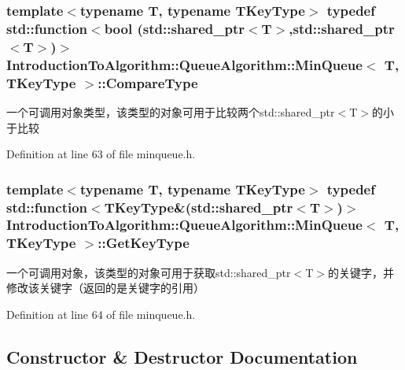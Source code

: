 \subsubsection[{Compare\+Type}]{\setlength{\rightskip}{0pt plus 5cm}template$<$typename T, typename T\+Key\+Type$>$ typedef std\+::function$<$bool (std\+::shared\+\_\+ptr$<$T$>$,std\+::shared\+\_\+ptr$<$T$>$)$>$ {\bf Introduction\+To\+Algorithm\+::\+Queue\+Algorithm\+::\+Min\+Queue}$<$ T, T\+Key\+Type $>$\+::{\bf Compare\+Type}}\label{class_introduction_to_algorithm_1_1_queue_algorithm_1_1_min_queue_a8f2f5b5d2b7097bbc6edda7b9c9228a6}
一个可调用对象类型，该类型的对象可用于比较两个std\+::shared\+\_\+ptr$<$\+T$>$的小于比较 

Definition at line 63 of file minqueue.\+h.

\hypertarget{class_introduction_to_algorithm_1_1_queue_algorithm_1_1_min_queue_a391cb754ab172d1d4cdefd34130b917c}{}
\subsubsection[{Get\+Key\+Type}]{\setlength{\rightskip}{0pt plus 5cm}template$<$typename T, typename T\+Key\+Type$>$ typedef std\+::function$<$T\+Key\+Type\&(std\+::shared\+\_\+ptr$<$T$>$)$>$ {\bf Introduction\+To\+Algorithm\+::\+Queue\+Algorithm\+::\+Min\+Queue}$<$ T, T\+Key\+Type $>$\+::{\bf Get\+Key\+Type}}\label{class_introduction_to_algorithm_1_1_queue_algorithm_1_1_min_queue_a391cb754ab172d1d4cdefd34130b917c}
一个可调用对象，该类型的对象可用于获取std\+::shared\+\_\+ptr$<$\+T$>$的关键字，并修改该关键字（返回的是关键字的引用） 

Definition at line 64 of file minqueue.\+h.



\subsection{Constructor \& Destructor Documentation}
\hypertarget{class_introduction_to_algorithm_1_1_queue_algorithm_1_1_min_queue_a98e54e4e2c19918032b09e23e79a25e5}{}
